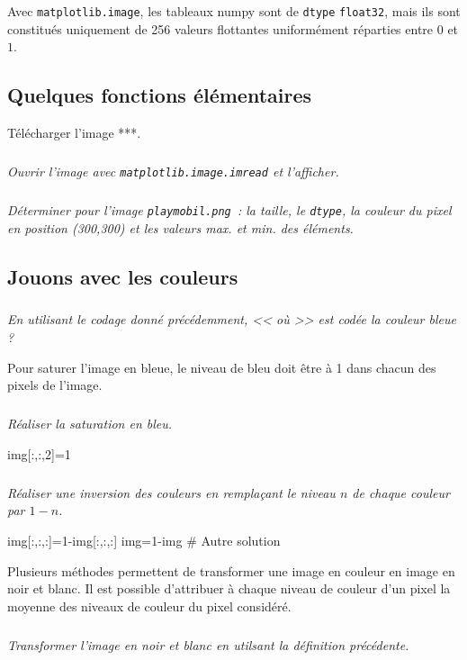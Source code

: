\documentclass[10pt,fleqn]{article} %
\begin{document}
\begin{multicols}{2}
\begin{remark}
  Avec \texttt{matplotlib.image}, les tableaux numpy sont de
  \texttt{dtype} \texttt{float32}, mais ils sont constitués uniquement
  de 256 valeurs flottantes uniformément réparties entre $0$ et $1$.
\end{remark}


\subsection*{Quelques fonctions élémentaires}
Télécharger l'image ***.
\subparagraph{}\textit{Ouvrir l'image avec \texttt{matplotlib.image.imread} et l'afficher.}


\subparagraph{}\textit{Déterminer pour l'image \texttt{playmobil.png}~: la taille, le
  \texttt{dtype}, la couleur du  pixel en position (300,300) et les
  valeurs max. et min. des éléments.}




\subsection*{Jouons avec les couleurs}
\subparagraph{}\textit{En utilisant le codage donné précédemment, << où >> est codée la couleur bleue ?}

Pour saturer l'image en bleue, le niveau de bleu doit être à 1 dans chacun des pixels de l'image. 

\subparagraph{}\textit{Réaliser la saturation en bleu.}

\begin{python}
img[:,:,2]=1
\end{python}

\subparagraph{}\textit{Réaliser une inversion des couleurs en remplaçant le niveau $n$ de chaque couleur par $1-n$.}
\begin{python}
img[:,:,:]=1-img[:,:,:]
img=1-img # Autre solution
\end{python}

Plusieurs méthodes permettent de transformer une image en couleur en image en noir et blanc. Il est possible d'attribuer à chaque niveau de couleur d'un pixel la moyenne des niveaux de couleur du pixel considéré. 


\subparagraph{}\textit{Transformer l'image en noir et blanc en utilsant la définition précédente.}













\end{multicols}
\end{document}
